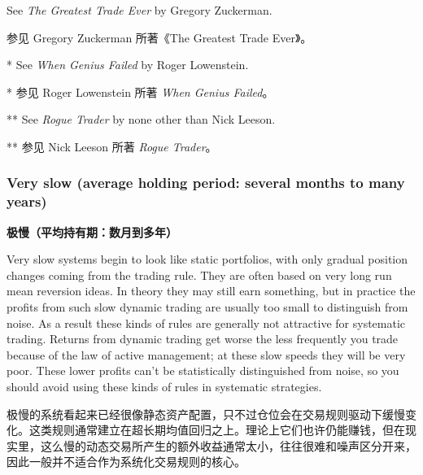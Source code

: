 \noindent * See \textit{The Greatest Trade Ever} by Gregory Zuckerman. \par \noindent * 参见 Gregory Zuckerman 所著《The Greatest Trade Ever》。

\noindent ** See \textit{When Genius Failed} by Roger Lowenstein. \par \noindent ** 参见 Roger Lowenstein 所著 \textit{When Genius Failed}。

\noindent *** See \textit{Rogue Trader} by none other than Nick Leeson. \par \noindent *** 参见 Nick Leeson 所著 \textit{Rogue Trader}。


\subsubsection*{Very slow (average holding period: several months to many years)} \medskip \noindent\textbf{极慢（平均持有期：数月到多年）} \par \smallskip

\begin{englishblock} Very slow systems begin to look like static portfolios, with only gradual position changes coming from the trading rule. They are often based on very long run mean reversion ideas. In theory they may still earn something, but in practice the profits from such slow dynamic trading are usually too small to distinguish from noise. As a result these kinds of rules are generally not attractive for systematic trading. Returns from dynamic trading get worse the less frequently you trade because of the law of active management; at these slow speeds they will be very poor. These lower profits can't be statistically distinguished from noise, so you should avoid using these kinds of rules in systematic strategies. \end{englishblock}

\begin{chineseblock}极慢的系统看起来已经很像静态资产配置，只不过仓位会在交易规则驱动下缓慢变化。这类规则通常建立在超长期均值回归之上。理论上它们也许仍能赚钱，但在现实里，这么慢的动态交易所产生的额外收益通常太小，往往很难和噪声区分开来，因此一般并不适合作为系统化交易规则的核心。\end{chineseblock}


